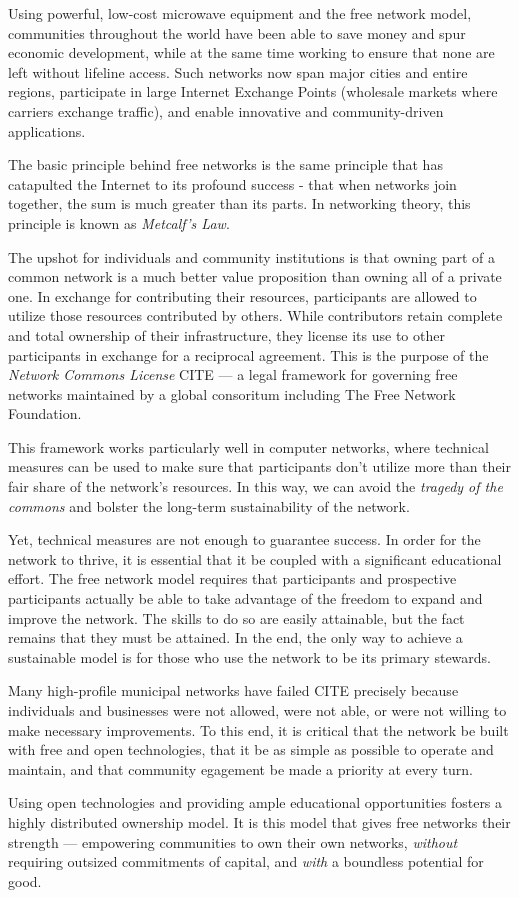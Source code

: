 Using powerful, low-cost  microwave equipment and the free network model,
communities throughout the world have been able to save money and spur economic
development, while at the same time
working to ensure that none are left without lifeline access. Such networks now
span major cities and entire regions, participate in large Internet Exchange Points
(wholesale markets where carriers exchange traffic), and enable innovative and community-driven 
applications. \par
The basic principle behind free networks is the same principle that has
catapulted the Internet to its profound success - that when networks join
together, the sum is much greater than its parts. In networking theory, this
principle is known as \emph{Metcalf's Law}. \par 
The upshot for individuals and community institutions is that owning part of a
common network is a much better value proposition than owning all of a private
one. In exchange for contributing their resources, participants are
allowed to utilize those resources contributed by others. While contributors
retain complete and total ownership of their infrastructure, they license its
use to other participants in exchange for a reciprocal agreement. This is the
purpose of the \emph{Network Commons License} CITE --- a legal framework for
governing free networks maintained by a global consoritum including The Free
Network Foundation. \par
This framework works particularly well in computer networks, where technical
measures can be used to make sure that participants don't utilize more than
their fair share of the network's resources.
In this way, we can avoid the \emph{tragedy of the commons}
and bolster the long-term sustainability of the network. \par
Yet, technical measures are not enough to guarantee success. In order for the
network to thrive, it is essential that it be coupled with a significant
educational effort. The free network model requires that participants and
prospective participants actually be able to take advantage of the freedom to
expand and improve the network. The skills to do so are easily attainable, but
the fact remains that they must be attained. In the end, the only way to achieve
a sustainable model is for those who use the network to be its primary stewards.\par
Many high-profile municipal networks have failed CITE precisely because individuals
and businesses were not allowed, were not able, or were not willing to make necessary improvements.
To this end, it is critical that the network be built with free and open
technologies, that it be as simple as possible to operate and maintain, and
that community egagement be made a priority at every turn.\par
Using open technologies and providing ample educational opportunities fosters
a highly distributed ownership model. It is this model that gives free networks
their strength --- empowering communities to own their own networks,
\emph{without} requiring outsized commitments of capital, and \emph{with} a
boundless potential for good.

